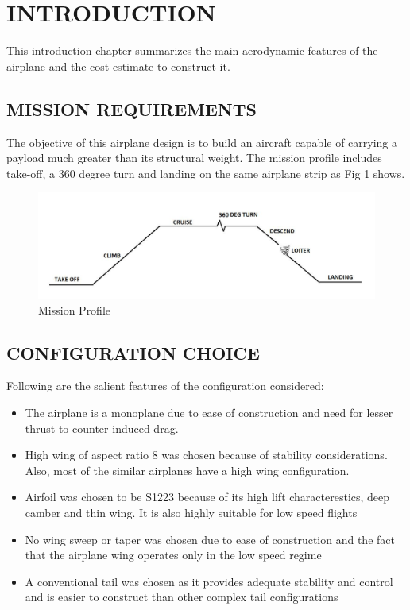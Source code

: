 \chapter{INTRODUCTION}
\label{ch1}
This introduction chapter summarizes the main aerodynamic features of the airplane and
the cost estimate to construct it.

\section{MISSION REQUIREMENTS}
\label{s:ch1_intro}
The objective of this airplane design is to build an aircraft capable of carrying
a payload much greater than its structural weight. The mission profile includes
take-off, a 360 degree turn and landing on the same airplane strip as Fig 1
shows.

\begin{figure}[H]
    \begin{center}
      \includegraphics[width=4.5in]{figures/missionreq.jpg}
     \caption{Mission Profile}
       \label{fig:mission_profile}
    \end{center}
\end{figure}
%
\section{CONFIGURATION CHOICE}
Following are the salient features of the configuration considered:
\begin{itemize}
\item The airplane is a monoplane due to ease of construction and need for lesser
thrust to counter induced drag.
\item High wing of aspect ratio 8 was chosen because of stability considerations.
Also, most of the similar airplanes have a high wing configuration.
\item Airfoil was chosen to be S1223 because of its high lift characterestics, deep
camber and thin wing. It is also highly suitable for low speed flights
\item No wing sweep or taper was chosen due to ease of construction and the
fact that the airplane wing operates only in the low speed regime
\item A conventional tail was chosen as it provides adequate stability and control
and is easier to construct than other complex tail configurations
\end{itemize}
 
